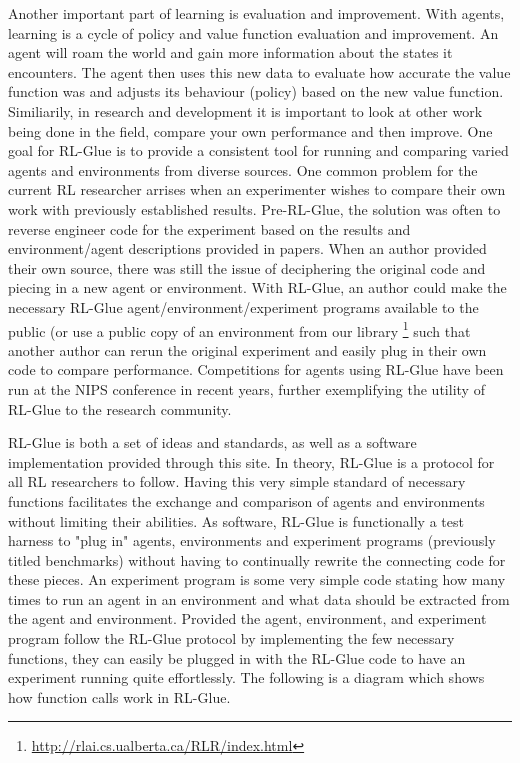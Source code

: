 \documentclass[11pt]{article}
\begin{document}
Another important part of learning is evaluation and improvement. With agents, learning is a cycle of policy and value function evaluation and improvement.  An agent will roam the world and gain more information about the states it encounters. The agent then uses this new data to evaluate how accurate the value function was and adjusts its behaviour (policy) based on the new value function. Similiarily, in research and development it is important to look at other work being done in the field, compare your own performance and then improve. One goal for RL-Glue is to provide a consistent tool for running and comparing varied agents and environments from diverse sources. One common problem for the current RL researcher arrises when an experimenter wishes to compare their own work with previously established results. Pre-RL-Glue, the solution was often to reverse engineer code for the experiment based on the results and environment/agent descriptions provided in papers.  When an author provided their own source, there was still the issue of deciphering the original code and piecing in a new agent or environment. With RL-Glue, an author could make the necessary RL-Glue agent/environment/experiment programs  available to the public (or use a public copy of an environment from our library \footnote{\url{http://rlai.cs.ualberta.ca/RLR/index.html}} such that another author can rerun the original experiment and easily plug in their own code to compare performance.  Competitions for agents using RL-Glue have been run at the NIPS conference in recent years, further exemplifying the utility of RL-Glue to the research community.
 

RL-Glue is both a set of ideas and standards, as well as a software implementation provided through this site. In theory, RL-Glue is a protocol for all RL researchers to follow. Having this very simple standard of necessary functions facilitates the exchange and comparison of agents and environments without limiting their abilities. As software, RL-Glue is functionally a test harness to "plug in" agents, environments and experiment programs (previously titled benchmarks) without having to continually rewrite the connecting code for these pieces. An experiment program is some very simple code stating how many times to run an agent in an environment and what data should be extracted from the agent and environment. Provided the agent, environment, and experiment program follow the RL-Glue protocol by implementing the few necessary functions, they can easily be plugged in with the RL-Glue code to have an experiment running quite effortlessly. The following is a diagram which shows how function calls work in RL-Glue.
\end{document}
